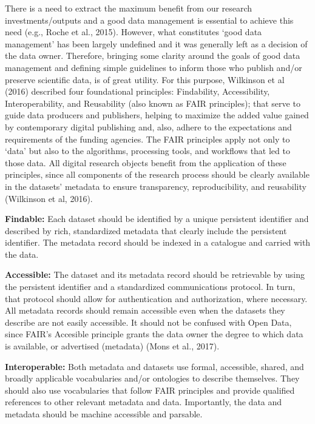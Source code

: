 \documentclass[
]{book}
\begin{document}
There is a need to extract the maximum benefit from our research investments/outputs and a good data management is essential to achieve this need (e.g., Roche et al., 2015). However, what constitutes `good data management' has been largely undefined and it was generally left as a decision of the data owner. Therefore, bringing some clarity around the goals of good data management and defining simple guidelines to inform those who publish and/or preserve scientific data, is of great utility. For this purpose, Wilkinson et al (2016) described four foundational principles: Findability, Accessibility, Interoperability, and Reusability (also known as FAIR principles); that serve to guide data producers and publishers, helping to maximize the added value gained by contemporary digital publishing and, also, adhere to the expectations and requirements of the funding agencies. The FAIR principles apply not only to `data' but also to the algorithms, processing tools, and workflows that led to those data. All digital research objects benefit from the application of these principles, since all components of the research process should be clearly available in the datasets' metadata to ensure transparency, reproducibility, and reusability (Wilkinson et al, 2016).

\textbf{Findable:} Each dataset should be identified by a unique persistent identifier and described by rich, standardized metadata that clearly include the persistent identifier. The metadata record should be indexed in a catalogue and carried with the data.

\textbf{Accessible:} The dataset and its metadata record should be retrievable by using the persistent identifier and a standardized communications protocol. In turn, that protocol should allow for authentication and authorization, where necessary. All metadata records should remain accessible even when the datasets they describe are not easily accessible. It should not be confused with Open Data, since FAIR's Accesible principle grants the data owner the degree to which data is available, or advertised (metadata) (Mons et al., 2017).

\textbf{Interoperable:} Both metadata and datasets use formal, accessible, shared, and broadly applicable vocabularies and/or ontologies to describe themselves. They should also use vocabularies that follow FAIR principles and provide qualified references to other relevant metadata and data. Importantly, the data and metadata should be machine accessible and parsable.
\end{document}
